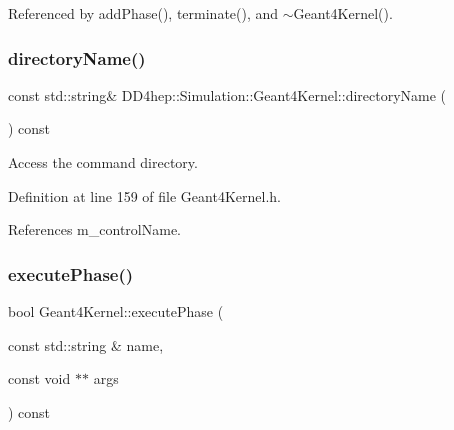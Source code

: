 Referenced by add\+Phase(), terminate(), and $\sim$\+Geant4\+Kernel().

\hypertarget{class_d_d4hep_1_1_simulation_1_1_geant4_kernel_ad922e8f9b10efb7503fad89764d98612}{}\label{class_d_d4hep_1_1_simulation_1_1_geant4_kernel_ad922e8f9b10efb7503fad89764d98612} 
\subsubsection{\texorpdfstring{directory\+Name()}{directoryName()}}
{\footnotesize\ttfamily const std\+::string\& D\+D4hep\+::\+Simulation\+::\+Geant4\+Kernel\+::directory\+Name (\begin{DoxyParamCaption}{ }\end{DoxyParamCaption}) const\hspace{0.3cm}{\ttfamily [inline]}}



Access the command directory. 



Definition at line 159 of file Geant4\+Kernel.\+h.



References m\+\_\+control\+Name.

\hypertarget{class_d_d4hep_1_1_simulation_1_1_geant4_kernel_a372116bbf95a9e9c63beb0906d8f222b}{}\label{class_d_d4hep_1_1_simulation_1_1_geant4_kernel_a372116bbf95a9e9c63beb0906d8f222b} 
\subsubsection{\texorpdfstring{execute\+Phase()}{executePhase()}}
{\footnotesize\ttfamily bool Geant4\+Kernel\+::execute\+Phase (\begin{DoxyParamCaption}\item[{const std\+::string \&}]{name,  }\item[{const void $\ast$$\ast$}]{args }\end{DoxyParamCaption}) const\hspace{0.3cm}{\ttfamily [virtual]}}



